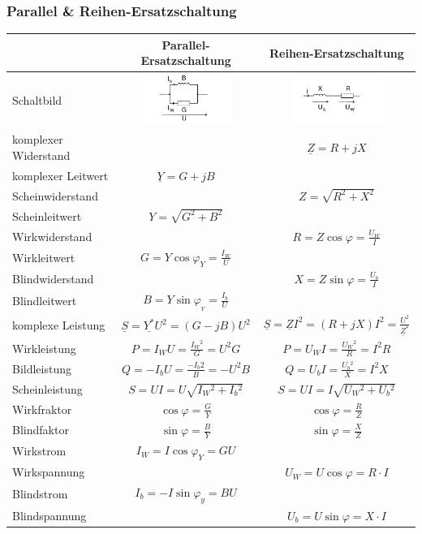 	\subsubsection{Parallel \& Reihen-Ersatzschaltung}
		
	\begin{centering}
			
	\begin{tabular}{|l|c|c|}
		\hline
			& Parallel-Ersatzschaltung & Reihen-Ersatzschaltung \\
		\hline
			Schaltbild & \includegraphics[width=3cm]{./images/RL_parallel.png} &
			\includegraphics[width=3cm]{./images/RL_Seriel.png}\\
		\hline
			komplexer Widerstand & & $\underline{Z}=R+jX$\\
			komplexer Leitwert & $\underline{Y}=G+jB$ &\\
		\hline
			Scheinwiderstand & & $Z=\sqrt{R^2+X^2}$\\
			Scheinleitwert & $Y=\sqrt{G^2+B^2}$ & \\
		\hline
			Wirkwiderstand & & $R=Z\cos\varphi=\frac{U_W}{I}$\\
			Wirkleitwert & $G=Y\cos\varphi_Y=\frac{I_W}{U}$&\\
		\hline
			Blindwiderstand & & $X=Z\sin\varphi=\frac{U_b}{I}$\\
			Blindleitwert & $B = Y\sin\varphi_{_Y} = \frac{I_b}{U}$&\\
		\hline
			komplexe Leistung & $\underline{S}=
			\underline{Y^*}U^2=\left(G-jB\right)U^2$& $\underline{S}=\underline{Z}I^2=\left(R+jX\right)I^2 = \frac{U^2}{\underline{Z}^{\ast}}$\\
			Wirkleistung & $P=I_W U=\frac{I{_W}{^2}}{G}=U^2G$ &
			$P=U_WI=\frac{U{_W}{^2}}{R}=I^2R$ \\
			Bildleistung & $Q=-I_bU=\frac{-I{_b}{2}}{B}=-U^2B$ & $Q = U_bI =
			\frac{U{_b}{^2}}{X}=I^2X$\\
			Scheinleistung & $S=UI=U\sqrt{I{_W}{^2}+I{_b}{^2}}$ & $S=UI =
			I\sqrt{U{_W}{^2}+U{_b}{^2}}$\\
		\hline
			Wirkfraktor & $\cos\varphi= \frac{G}{Y}$ & $\cos\varphi=\frac{R}{Z}$\\
			Blindfaktor & $\sin\varphi= \frac{B}{Y}$ & $\sin\varphi=\frac{X}{Z}$\\
		\hline
			Wirkstrom & $I_W=I\cos\varphi_Y=GU$ & \\
			Wirkspannung & & $U_W = U\cos\varphi =R \cdot I$ \\
		\hline
			Blindstrom & $I_b = -I \sin\varphi_y = BU$ & \\
			Blindspannung & & $U_b=U\sin\varphi=X\cdot I$\\
		\hline
	\end{tabular}\\
	\end{centering}

